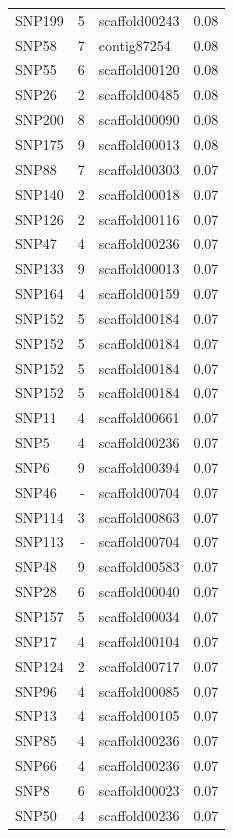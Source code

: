 \begin{longtable}{lrlr}
  SNP199 &   5 & scaffold00243 & 0.08 \\ 
  SNP58 &   7 & contig87254 & 0.08 \\ 
  SNP55 &   6 & scaffold00120 & 0.08 \\ 
  SNP26 &   2 & scaffold00485 & 0.08 \\ 
  SNP200 &   8 & scaffold00090 & 0.08 \\ 
  SNP175 &   9 & scaffold00013 & 0.08 \\ 
  SNP88 &   7 & scaffold00303 & 0.07 \\ 
  SNP140 &   2 & scaffold00018 & 0.07 \\ 
  SNP126 &   2 & scaffold00116 & 0.07 \\ 
  SNP47 &   4 & scaffold00236 & 0.07 \\ 
  SNP133 &   9 & scaffold00013 & 0.07 \\ 
  SNP164 &   4 & scaffold00159 & 0.07 \\ 
  SNP152 &   5 & scaffold00184 & 0.07 \\ 
  SNP152 &   5 & scaffold00184 & 0.07 \\ 
  SNP152 &   5 & scaffold00184 & 0.07 \\ 
  SNP152 &   5 & scaffold00184 & 0.07 \\ 
  SNP11 &   4 & scaffold00661 & 0.07 \\ 
  SNP5 &   4 & scaffold00236 & 0.07 \\ 
  SNP6 &   9 & scaffold00394 & 0.07 \\ 
  SNP46 & - & scaffold00704 & 0.07 \\ 
  SNP114 &   3 & scaffold00863 & 0.07 \\ 
  SNP113 & - & scaffold00704 & 0.07 \\ 
  SNP48 &   9 & scaffold00583 & 0.07 \\ 
  SNP28 &   6 & scaffold00040 & 0.07 \\ 
  SNP157 &   5 & scaffold00034 & 0.07 \\ 
  SNP17 &   4 & scaffold00104 & 0.07 \\ 
  SNP124 &   2 & scaffold00717 & 0.07 \\ 
  SNP96 &   4 & scaffold00085 & 0.07 \\ 
  SNP13 &   4 & scaffold00105 & 0.07 \\ 
  SNP85 &   4 & scaffold00236 & 0.07 \\ 
  SNP66 &   4 & scaffold00236 & 0.07 \\ 
  SNP8 &   6 & scaffold00023 & 0.07 \\ 
  SNP50 &   4 & scaffold00236 & 0.07 \\ 

\end{longtable}
